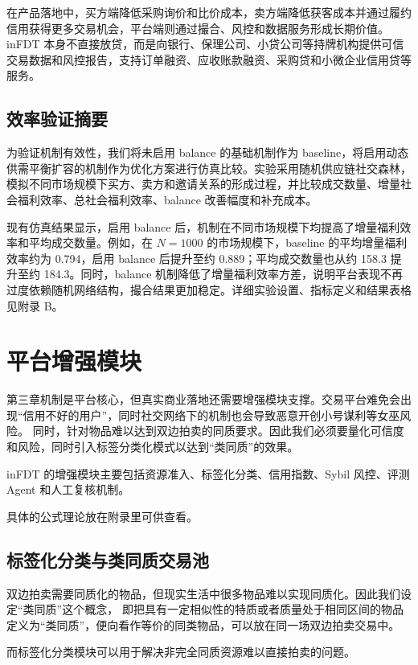 \documentclass[UTF8,a4paper,12pt]{ctexart}
\begin{document}
在产品落地中，买方端降低采购询价和比价成本，卖方端降低获客成本并通过履约信用获得更多交易机会，平台端则通过撮合、风控和数据服务形成长期价值。inFDT 本身不直接放贷，而是向银行、保理公司、小贷公司等持牌机构提供可信交易数据和风控报告，支持订单融资、应收账款融资、采购贷和小微企业信用贷等服务。

\subsection{效率验证摘要}

为验证机制有效性，我们将未启用 balance 的基础机制作为 baseline，将启用动态供需平衡扩容的机制作为优化方案进行仿真比较。实验采用随机供应链社交森林，模拟不同市场规模下买方、卖方和邀请关系的形成过程，并比较成交数量、增量社会福利效率、总社会福利效率、balance 改善幅度和补充成本。

现有仿真结果显示，启用 balance 后，机制在不同市场规模下均提高了增量福利效率和平均成交数量。例如，在 \(N=1000\) 的市场规模下，baseline 的平均增量福利效率约为 0.794，启用 balance 后提升至约 0.889；平均成交数量也从约 158.3 提升至约 184.3。同时，balance 机制降低了增量福利效率方差，说明平台表现不再过度依赖随机网络结构，撮合结果更加稳定。详细实验设置、指标定义和结果表格见附录 B。

\section{平台增强模块}

第三章机制是平台核心，但真实商业落地还需要增强模块支撑。交易平台难免会出现“信用不好的用户”，同时社交网络下的机制也会导致恶意开创小号谋利等女巫风险。
同时，针对物品难以达到双边拍卖的同质要求。因此我们必须要量化可信度和风险，同时引入标签分类化模式以达到“类同质”的效果。

inFDT 的增强模块主要包括资源准入、标签化分类、信用指数、Sybil 风控、评测 Agent 和人工复核机制。

具体的公式理论放在附录里可供查看。



\subsection{标签化分类与类同质交易池}

双边拍卖需要同质化的物品，但现实生活中很多物品难以实现同质化。因此我们设定“类同质”这个概念，
即把具有一定相似性的特质或者质量处于相同区间的物品定义为“类同质”，便向看作等价的同类物品，可以放在同一场双边拍卖交易中。

而标签化分类模块可以用于解决非完全同质资源难以直接拍卖的问题。
\end{document}
